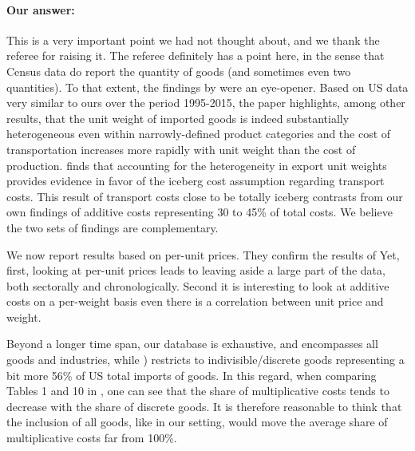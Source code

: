 \documentclass[a4paper,11pt]{article}
\begin{document}
\paragraph{Our answer:}
\noindent This is a very important point we had not thought about, and we thank the referee for raising it.
The referee definitely has a point here, in the sense that Census data do report the quantity of goods (and sometimes even two quantities).
To that extent, the findings by \cite{Lashkaripour_JIE2020} were an eye-opener.
Based on US data very similar to ours over the period 1995-2015, the paper highlights, among other results, that the unit weight of imported goods is indeed substantially heterogeneous even within narrowly-defined product categories and the cost of transportation increases more rapidly with unit weight than the cost of production.  \cite{Lashkaripour_JIE2020} finds that accounting for the heterogeneity in export unit weights provides evidence in favor of the iceberg cost assumption regarding transport costs.
This result of transport costs close to be totally iceberg contrasts from our own findings of additive costs representing 30 to 45\% of total costs.
We believe the two sets of findings are complementary.

We now report results based on per-unit prices.
They confirm the results of \cite{Lashkaripour_JIE2020}
Yet, first, looking at per-unit prices leads to leaving aside a large part of the data, both sectorally and chronologically.
Second  it is interesting to look at additive costs on a per-weight basis even there is a correlation between unit price and weight.

Beyond a longer time span, our database is exhaustive, and encompasses all goods and industries, while \citet{Lashkaripour_JIE2020}) restricts to indivisible/discrete goods representing a bit more 56\% of US total imports of goods. In this regard, when comparing Tables 1 and 10 in \citet{Lashkaripour_JIE2020}, one can see that the share of multiplicative costs tends to decrease with the share of discrete goods. It is therefore reasonable to think that the inclusion of all goods, like in our setting, would move the average share of multiplicative costs far from 100\%.
\end{document}
